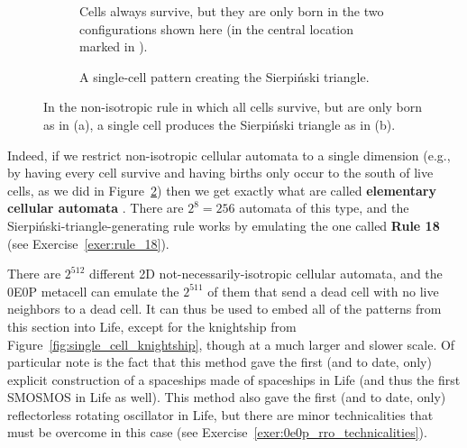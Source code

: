\begin{figure}[!htb]
	\centering
	\begin{subfigure}{.42\textwidth}
		\centering
		\caption{Cells always survive, but they are only born in the two configurations shown here (in the central location marked in ).}
		\label{fig:non_iso_rule_18}
	\end{subfigure} \hfill \begin{subfigure}{.53\textwidth}
		\centering
		\caption{A single-cell pattern creating the Sierpi\'{n}ski triangle.}
		\label{fig:single_cell_sierpinski}
	\end{subfigure}
	\caption{In the non-isotropic rule in which all cells survive, but are only born as in (a), a single cell produces the Sierpi\'{n}ski triangle as in (b).}\label{fig:single_cell_weird}
\end{figure}

Indeed, if we restrict non-isotropic cellular automata to a single dimension (e.g., by having every cell survive and having births only occur to the south of live cells, as we did in Figure~\ref{fig:single_cell_sierpinski}) then we get exactly what are called \textbf{elementary cellular automata} \cite{Wolfram2002}. There are $2^8 = 256$ automata of this type, and the Sierpi\'{n}ski-triangle-generating rule works by emulating the one called \textbf{Rule 18} (see Exercise~\ref{exer:rule_18}).

There are $2^{512}$ different 2D not-necessarily-isotropic cellular automata, and the 0E0P metacell can emulate the $2^{511}$ of them that send a dead cell with no live neighbors to a dead cell. It can thus be used to embed all of the patterns from this section into Life, except for the knightship from Figure~\ref{fig:single_cell_knightship}, though at a much larger and slower scale. Of particular note is the fact that this method gave the first (and to date, only) explicit construction of a spaceships made of spaceships in Life (and thus the first SMOSMOS in Life as well). This method also gave the first (and to date, only) reflectorless rotating oscillator in Life, but there are minor technicalities that must be overcome in this case (see Exercise~\ref{exer:0e0p_rro_technicalities}).



